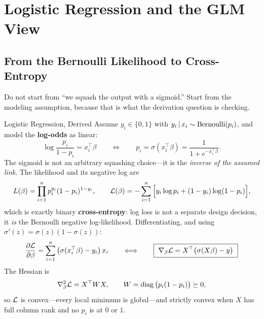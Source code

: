 \section{Logistic Regression and the GLM View}
\label{cml:sec:logistic_glm}

\subsection{From the Bernoulli Likelihood to Cross-Entropy}

Do not start from ``we squash the output with a sigmoid.'' Start from the modeling assumption, because that is what the derivation question is checking.

\begin{mathresult}{Logistic Regression, Derived}
Assume $y_i \in \{0,1\}$ with $y_i \,|\, x_i \sim \mathrm{Bernoulli}(p_i)$, and model the \textbf{log-odds} as linear:
\begin{equation}
\log\frac{p_i}{1-p_i} = x_i^{\top}\beta
\qquad\Longleftrightarrow\qquad
p_i = \sigma(x_i^{\top}\beta) = \frac{1}{1+e^{-x_i^{\top}\beta}} .
\end{equation}
The sigmoid is not an arbitrary squashing choice---it is the \emph{inverse of the assumed link}. The likelihood and its negative log are
\begin{equation}
L(\beta) = \prod_{i=1}^{n} p_i^{y_i}(1-p_i)^{1-y_i},
\qquad
\mathcal{L}(\beta) = -\sum_{i=1}^{n}\Big[y_i\log p_i + (1-y_i)\log(1-p_i)\Big],
\end{equation}
which is exactly binary \textbf{cross-entropy}: log loss is not a separate design decision, it \emph{is} the Bernoulli negative log-likelihood. Differentiating, and using $\sigma'(z) = \sigma(z)(1-\sigma(z))$:
\begin{equation}
\frac{\partial \loss}{\partial \beta} = \sum_{i=1}^{n}\big(\sigma(x_i^{\top}\beta) - y_i\big)\,x_i
\qquad\Longleftrightarrow\qquad
\boxed{\ \nabla_\beta \loss = X^{\top}\big(\sigma(X\beta) - y\big)\ }
\end{equation}
The Hessian is
\begin{equation}
\nabla^2_\beta \mathcal{L} = X^{\top}W X, \qquad W = \operatorname{diag}\big(p_i(1-p_i)\big) \succeq 0 ,
\end{equation}
so $\mathcal{L}$ is convex---every local minimum is global---and strictly convex when $X$ has full column rank and no $p_i$ is at $0$ or $1$.
\end{mathresult}


